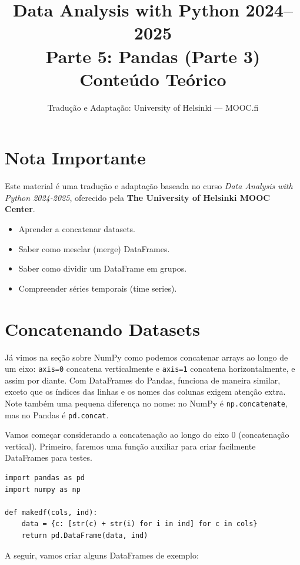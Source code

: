 \documentclass[11pt,a4paper]{article}
\title{\textbf{Data Analysis with Python 2024--2025}\\Parte 5: Pandas (Parte 3)\\\large Conteúdo Teórico}
\author{Tradução e Adaptação: University of Helsinki --- MOOC.fi}
\date{}
\begin{document}
\maketitle

\section*{Nota Importante}
Este material é uma tradução e adaptação baseada no curso \textit{Data Analysis with Python 2024-2025}, oferecido pela \textbf{The University of Helsinki MOOC Center}.

\begin{objetivos}
\begin{itemize}
    \item Aprender a concatenar datasets.
    \item Saber como mesclar (merge) DataFrames.
    \item Saber como dividir um DataFrame em grupos.
    \item Compreender séries temporais (time series).
\end{itemize}
\end{objetivos}

\tableofcontents
\newpage

\section{Concatenando Datasets}

Já vimos na seção sobre NumPy como podemos concatenar arrays ao longo de um eixo: \texttt{axis=0} concatena verticalmente e \texttt{axis=1} concatena horizontalmente, e assim por diante. Com DataFrames do Pandas, funciona de maneira similar, exceto que os índices das linhas e os nomes das colunas exigem atenção extra. Note também uma pequena diferença no nome: no NumPy é \texttt{np.concatenate}, mas no Pandas é \texttt{pd.concat}.

Vamos começar considerando a concatenação ao longo do eixo 0 (concatenação vertical). Primeiro, faremos uma função auxiliar para criar facilmente DataFrames para testes.

\begin{lstlisting}
import pandas as pd
import numpy as np

def makedf(cols, ind):
    data = {c: [str(c) + str(i) for i in ind] for c in cols}
    return pd.DataFrame(data, ind)
\end{lstlisting}

A seguir, vamos criar alguns DataFrames de exemplo:
\end{document}
